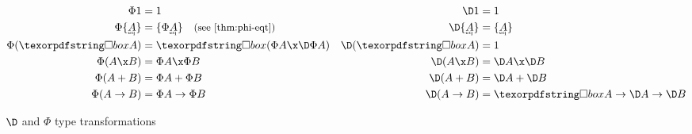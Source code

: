 \begin{figure}\centering
  \begin{align*}
    \Phi\tunit &= \tunit
    &
    \D\tunit &= \tunit
    \\
    \Phi\tseteq A &= \tset{\Phi{\eqt A}}
    \quad\text{\small(see \cref{thm:phi-eqt})}
    &
    \D\tseteq A &= \tseteq A
    \\
    \Phi(\iso A) &= \iso{(\Phi A \x \DP A)}
    &
    \D(\iso A) &= \tunit
    \\
    \Phi(A \x B) &= \Phi A \x \Phi B
    &
    \D(A \x B) &= \D A \x \D B
    \\
    \Phi(A + B) &= \Phi A + \Phi B
    &
    \D(A + B) &= \D A + \D B
    \\
    \Phi(A \to B) &= \Phi A \to \Phi B
    &
    \D(A \to B) &= \iso A \to \D A \to \D B
  \end{align*}

  \caption{$\D$ and $\Phi$ type transformations}
  \label{fig:DeltaPhi}
\end{figure}
